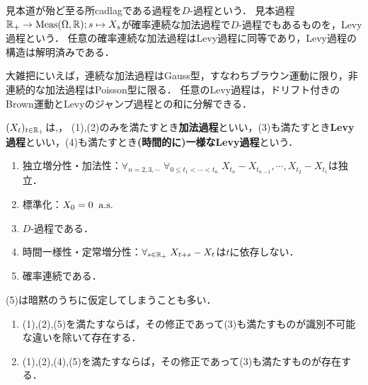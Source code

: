 \documentclass[uplatex,dvipdfmx]{jsreport}
\begin{document}
\begin{tcolorbox}[colframe=ForestGreen, colback=ForestGreen!10!white,breakable,colbacktitle=ForestGreen!40!white,coltitle=black,fonttitle=\bfseries\sffamily,
    title=]
    見本道が殆ど至る所cadlagである過程を$D$-過程という．
    見本過程$\mathbb{R}_+\to\mathrm{Meas}(\Omega,\mathbb{R});s\mapsto X_s$が確率連続な加法過程で$D$-過程でもあるものを，Levy過程という．
    任意の確率連続な加法過程はLevy過程に同等であり，Levy過程の構造は解明済みである．

    大雑把にいえば，連続な加法過程はGauss型，すなわちブラウン運動に限り，非連続的な加法過程はPoisson型に限る．
    任意のLevy過程は，ドリフト付きのBrown運動とLevyのジャンプ過程との和に分解できる．
\end{tcolorbox}

\begin{definition}
    $(X_t)_{t\in\mathbb{R}_+}$は,，
    (1),(2)のみを満たすとき\textbf{加法過程}といい，(3)も満たすとき\textbf{Levy過程}といい，(4)も満たすとき\textbf{(時間的に)一様なLevy過程}という．
    \begin{enumerate}
        \item 独立増分性・加法性：$\forall_{n=2,3,\cdots}\;\forall_{0\le t_1<\cdots<t_n}\;X_{t_n}-X_{t_{n-1}},\cdots,X_{t_2}-X_{t_1}$は独立．
        \item 標準化：$X_0=0\;\;\mathrm{a.s.}$
        \item $D$-過程である．
        \item 時間一様性・定常増分性：$\forall_{s\in\mathbb{R}_+}\;X_{t+s}- X_t$は$t$に依存しない．
        \item 確率連続である．
    \end{enumerate}
    (5)は暗黙のうちに仮定してしまうことも多い．
\end{definition}

\begin{theorem}[$D$-変形]\mbox{}
    \begin{enumerate}
        \item (1),(2),(5)を満たすならば，その修正であって(3)も満たすものが識別不可能な違いを除いて存在する．
        \item (1),(2),(4),(5)を満たすならば，その修正であって(3)も満たすものが存在する．
    \end{enumerate}
\end{theorem}
\end{document}
